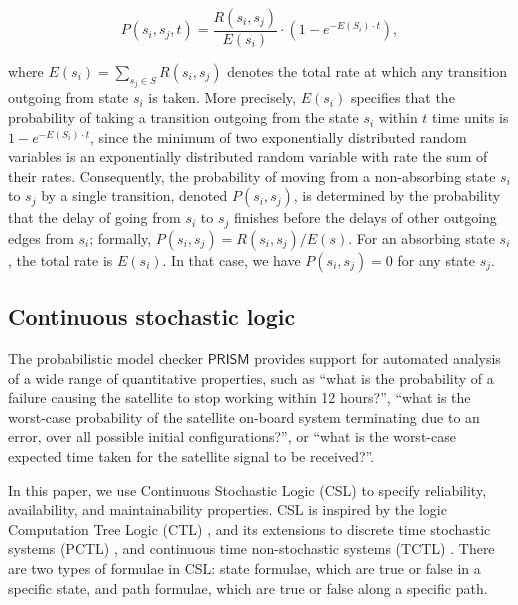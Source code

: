 \documentclass[preprint,12pt]{qrei}
\begin{document}
\begin{equation}
P(s_{i},s_{j},t)=\frac{R(s_{i},s_{j})}{E(s_{i})}\cdot(1-e^{-E(S_{i})\cdot t}),
\end{equation}

\noindent where $E(s_{i}) =\sum_{s_{j}\in S}R(s_{i}, s_{j})$ denotes the total rate at which any transition outgoing from state $s_{i}$ is taken. More precisely, $E(s_{i})$ specifies that the probability of taking a transition outgoing from the state $s_{i}$ within $t$ time units is $1-e^{-E(S_{i})\cdot t}$, since the minimum of two exponentially distributed random variables is an exponentially distributed random variable with rate the sum of their rates. Consequently, the probability of moving from a non-absorbing state $s_{i}$ to $s_{j}$ by a single transition, denoted $P(s_{i},s_{j})$, is determined by the probability that the delay of going from $s_{i}$ to $s_{j}$ finishes before the delays of other outgoing edges from $s_{i}$; formally, $P(s_{i},s_{j}) = R(s_{i},s_{j})/E(s)$. For an absorbing state $s_{i}$, the total rate is $E(s_{i})$. In that case, we have $P(s_{i},s_{j})=0$ for any state $s_{j}$.

\subsection{Continuous stochastic logic}

The probabilistic model checker $\mathsf{PRISM}$ provides support for automated analysis of a wide range of quantitative properties, such as \textquotedblleft what is the probability of a failure causing the satellite to stop working within 12 hours?\textquotedblright, \textquotedblleft what is the worst-case probability of the satellite on-board system terminating due to an error, over all possible initial configurations?\textquotedblright, or \textquotedblleft what is the worst-case expected time taken for the satellite signal to be received?\textquotedblright.

In this paper, we use Continuous Stochastic Logic (CSL) \cite{ASS+96,BKH99} to specify reliability, availability, and maintainability properties. CSL is inspired by the logic Computation Tree Logic (CTL) \cite{Eme90}, and its extensions to discrete time stochastic systems (PCTL) \cite{HJ94}, and continuous time non-stochastic systems (TCTL) \cite{ACD90}. There are two types of formulae in CSL: state formulae, which are true or false in a specific state, and path formulae, which are true or false along a specific path.
\end{document}
